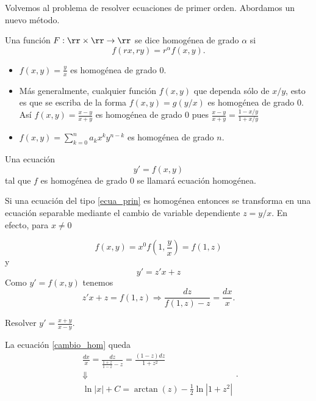 Volvemos al problema de resolver ecuaciones de primer orden. Abordamos un nuevo método.

\begin{definicion}
 Una función $F:\rr\times\rr\to\rr$ se dice homogénea de grado $\alpha$ si
 \[f(rx,ry)=r^{\alpha}f(x,y).\]
\end{definicion}

\begin{ejemplo}

\begin{itemize}
                 \item $f(x,y)=\tfrac{y}{x}$ es homogénea de grado $0$.
                 \item Más generalmente, cualquier función $f(x,y)$ que dependa sólo de $x/y$, esto es que se escriba de la forma $f(x,y)=g(y/x)$
                 es homogénea de grado  $0$. Así $f(x,y)=\tfrac{x-y}{x+y}$ es homogénea de grado $0$ pues $\tfrac{x-y}{x+y}= \tfrac{1-x/y}{1+x/y}$
                 \item $f(x,y)=\sum_{k=0}^na_kx^ky^{n-k}$ es homogénea de grado $n$.
\end{itemize}
\end{ejemplo}



\begin{definicion}
 Una ecuación
 \begin{equation}\label{ecua_prin}y'=f(x,y)\end{equation}
 tal que $f$ es homogénea de grado $0$ se llamará ecuación homogénea.
\end{definicion}

Si una ecuación del tipo \eqref{ecua_prin} es homogénea entonces se transforma en una ecuación separable mediante el cambio de variable dependiente $\boxed{z=y/x}$. En efecto, para $x\neq 0$

\[f(x,y)=x^0f\left(1,\frac{y}{x}\right)=f(1,z)\]
y
\[y'=z'x+z\]
Como $y'=f(x,y)$ tenemos
\begin{equation}\label{cambio_hom}z'x+z=f(1,z)\Longrightarrow \frac{dz}{f(1,z)-z}=\frac{dx}{x}.\end{equation}



\begin{ejemplo} Resolver $y'=\frac{x+y}{x-y}$.

La ecuación \eqref{cambio_hom} queda
\[ \begin{array}{c} \frac{dx}{x}=\frac{dz}{\frac{1+z}{1-z}-z}=\frac{(1-z)dz}{1+z^2}\\
 \Downarrow\\
\ln|x|+C=\arctan(z)-\frac{1}{2}\ln|1+z^2|
    \end{array}.
\]

\end{ejemplo}



